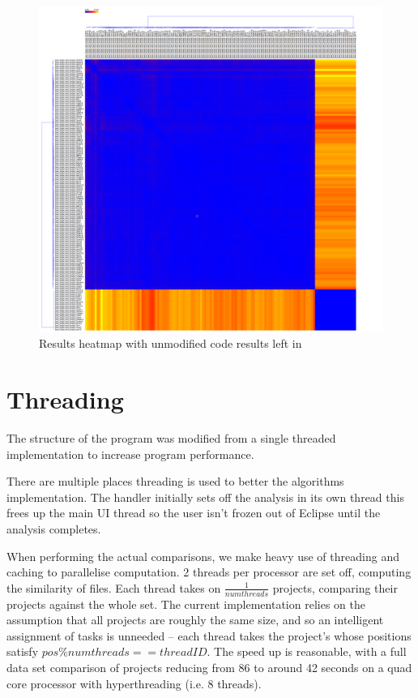 \begin{figure}[H]
	\centering
		\includegraphics[width=\textwidth]{Figures/LoopArraySkeletonHeatmap}
	\caption{Results heatmap with unmodified code results left in}
	\label{fig:skeletonHeatmap}
\end{figure}

\section{Threading}

The structure of the program was modified from a single threaded implementation to
increase program performance.

There are multiple places threading is used to better the algorithms 
implementation. The handler initially sets off the analysis in its own thread
this frees up the main UI thread so the user isn't frozen out of
Eclipse until the analysis completes.

When performing the actual comparisons, we make heavy use of threading and caching
to parallelise computation. 2 threads per processor are set off, computing the similarity
of files. Each thread takes on $\frac{1}{num threads}$ projects, 
comparing their projects against the whole set. The current implementation relies on the
assumption that all projects are roughly the same size, and so an intelligent
assignment of tasks is unneeded -- each thread takes the project's whose positions
satisfy $pos \% num threads == thread ID$. The speed up is reasonable, with
a full data set comparison of projects reducing from 86 to around 42 seconds on
a quad core processor with hyperthreading (i.e. 8 threads).


